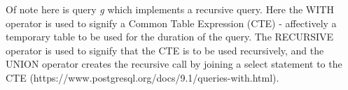 \documentclass[12pt]{article}
\begin{document}
Of note here is query \emph{g} which implements a recursive query. Here the WITH operator is used to signify a Common Table Expression (CTE) - affectively a temporary table to be used for the duration of the query. The RECURSIVE operator is used to signify that the CTE is to be used recursively, and the UNION operator creates the recursive call by joining a select statement to the CTE (https://www.postgresql.org/docs/9.1/queries-with.html).
\end{document}
